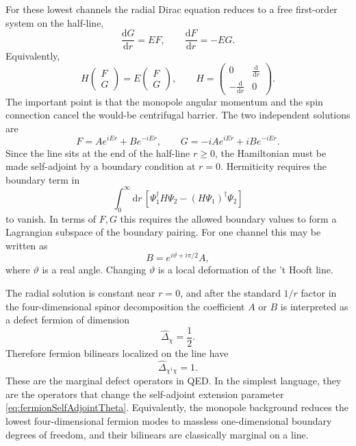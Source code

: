 \documentclass[11pt]{article}
\newcommand{\dd}{\mathrm{d}}
\begin{document}
For these lowest channels the radial Dirac equation reduces to a free first-order system on the half-line,
\begin{equation}
  \frac{\dd G}{\dd r}=E F,
  \qquad
  \frac{\dd F}{\dd r}=-E G .
  \label{eq:fermionRadialFree}
\end{equation}
Equivalently,
\begin{equation}
  H
  \begin{pmatrix}F\\G\end{pmatrix}
  =E\begin{pmatrix}F\\G\end{pmatrix},
  \qquad
  H=\begin{pmatrix}
  0&\frac{\dd}{\dd r}\\[2pt]
  -\frac{\dd}{\dd r}&0
  \end{pmatrix} .
\end{equation}
The important point is that the monopole angular momentum and the spin connection cancel the would-be centrifugal barrier.  The two independent solutions are
\begin{equation}
  F=Ae^{iEr}+Be^{-iEr},
  \qquad
  G=-iAe^{iEr}+iBe^{-iEr} .
\end{equation}
Since the line sits at the end of the half-line $r\ge0$, the Hamiltonian must be made self-adjoint by a boundary condition at $r=0$.  Hermiticity requires the boundary term in
\begin{equation}
  \int_0^\infty\dd r\,\left[\Psi_1^\dagger H\Psi_2-(H\Psi_1)^\dagger\Psi_2\right]
\end{equation}
to vanish.  In terms of $F,G$ this requires the allowed boundary values to form a Lagrangian subspace of the boundary pairing.  For one channel this may be written as
\begin{equation}
  B=e^{i\vartheta+i\pi/2}A,
  \label{eq:fermionSelfAdjointTheta}
\end{equation}
where $\vartheta$ is a real angle.  Changing $\vartheta$ is a local deformation of the 't Hooft line.

The radial solution is constant near $r=0$, and after the standard $1/r$ factor in the four-dimensional spinor decomposition the coefficient $A$ or $B$ is interpreted as a defect fermion of dimension
\begin{equation}
  \widehat\Delta_\chi=\frac12 .
\end{equation}
Therefore fermion bilinears localized on the line have
\begin{equation}
  \widehat\Delta_{\chi^\dagger\chi}=1 .
  \label{eq:fermionBilinearThooftMarginal}
\end{equation}
These are the marginal defect operators in QED.  In the simplest language, they are the operators that change the self-adjoint extension parameter \eqref{eq:fermionSelfAdjointTheta}.  Equivalently, the monopole background reduces the lowest four-dimensional fermion modes to massless one-dimensional boundary degrees of freedom, and their bilinears are classically marginal on a line.
\end{document}

